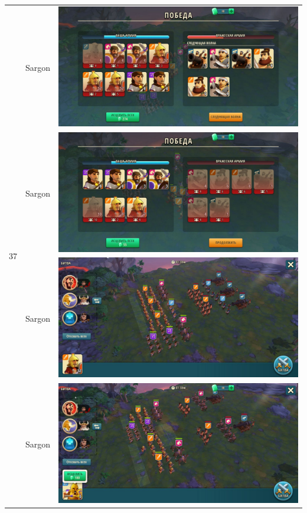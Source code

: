 \begin{longtable}{|c|c|c|}
    \hline
    \multirow{4}{*}{37} & Sargon &
    \includegraphics[width=0.75\linewidth]{./parts/media/TreasureHunt/37/sargon/photo_2022-04-07_13-16-57.jpg} \\
    & Sargon &
    \includegraphics[width=0.75\linewidth]{./parts/media/TreasureHunt/37/sargon/photo_2022-04-07_13-17-09.jpg} \\
    & Sargon &
    \includegraphics[width=0.75\linewidth]{./parts/media/TreasureHunt/37/sargon/photo_2022-04-07_13-16-49.jpg} \\
    & Sargon &
    \includegraphics[width=0.75\linewidth]{./parts/media/TreasureHunt/37/sargon/photo_2022-04-07_13-17-01.jpg} \\

\end{longtable}
